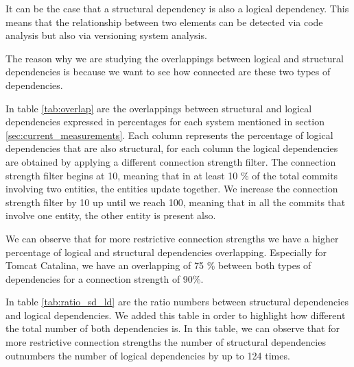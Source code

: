 \documentclass[12pt]{mitthesis}
\begin{document}
It can be the case that a structural dependency is also a logical dependency. This means that the relationship between two elements can be detected via code analysis but also via versioning system analysis. 

The reason why we are studying the overlappings between logical and structural dependencies is because we want to see how connected are these two types of dependencies.

In table \ref{tab:overlap} are the overlappings between structural and logical dependencies expressed in percentages for each system mentioned in section \ref{sec:current_measurements}. Each column represents the percentage of logical dependencies that are also structural, for each column the logical dependencies are obtained by applying a different connection strength filter. The connection strength filter begins at 10, meaning that in at least 10 \% of the total commits involving two entities, the entities update together. We increase the connection strength filter by 10 up until we reach 100, meaning that in all the commits that involve one entity, the other entity is present also.


We can observe that for more restrictive connection strengths we have a higher percentage of logical and structural dependencies overlapping. 
Especially for Tomcat Catalina, we have an overlapping of 75 \% between both types of dependencies for a connection strength of 90\%. 

In table \ref{tab:ratio_sd_ld} are the ratio numbers between structural dependencies and logical dependencies. We added this table in order to highlight how different the total number of both dependencies is. 
In this table, we can observe that for more restrictive connection strengths the number of structural dependencies outnumbers the number of logical dependencies by up to 124 times.


\begin{table}[!h]
\renewcommand{\arraystretch}{1}
\caption{Percentage of logical dependencies that are also structural dependencies}
\label{tab:overlap}
\centering
{}
\end{table}
\end{document}
